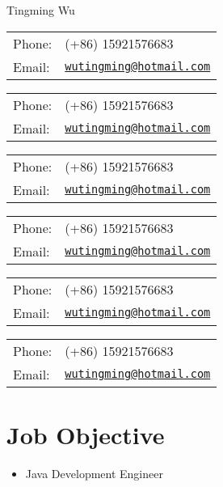 \documentclass[letterpaper, UTF8]{article}
\def\name{Tingming Wu}
\begin{document}
	
	{\huge \name}
	
	
	\vspace{0.15in}  %
	
	\begin{minipage}{0.45\linewidth}
		\begin{tabular}{ll}
			Phone: & (+86) 15921576683 \\
			Email: & \href{mailto:wutingming@hotmail.com}{\tt wutingming@hotmail.com} \\
		\end{tabular}
		\begin{tabular}{ll}
			Phone: & (+86) 15921576683 \\
			Email: & \href{mailto:wutingming@hotmail.com}{\tt wutingming@hotmail.com} \\
		\end{tabular}
		\begin{tabular}{ll}
			Phone: & (+86) 15921576683 \\
			Email: & \href{mailto:wutingming@hotmail.com}{\tt wutingming@hotmail.com} \\
		\end{tabular}
	\end{minipage}
	\begin{minipage}{0.45\linewidth}
		\begin{tabular}{ll}
			Phone: & (+86) 15921576683 \\
			Email: & \href{mailto:wutingming@hotmail.com}{\tt wutingming@hotmail.com} \\
		\end{tabular}
		\begin{tabular}{ll}
			Phone: & (+86) 15921576683 \\
			Email: & \href{mailto:wutingming@hotmail.com}{\tt wutingming@hotmail.com} \\
		\end{tabular}
		\begin{tabular}{ll}
			Phone: & (+86) 15921576683 \\
			Email: & \href{mailto:wutingming@hotmail.com}{\tt wutingming@hotmail.com} \\
		\end{tabular}
	\end{minipage}
	\vspace{-0.1in}
	
	\section*{\textbf{Job Objective}}\vspace{-0.05in}
	\begin{itemize}
		\item Java Development Engineer
	\end{itemize}
	\vspace{-0.25in}
	
\end{document}
